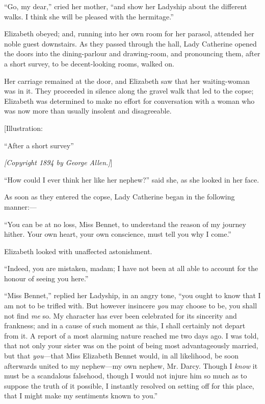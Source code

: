 \documentclass[12pt]{book}
\begin{document}
``Go, my dear,'' cried her mother, ``and show her Ladyship about the different walks. I think she will be pleased with the hermitage.''

Elizabeth obeyed; and, running into her own room for her parasol, attended her noble guest downstairs. As they passed through the hall, Lady Catherine opened the doors into the dining-parlour and drawing-room, and pronouncing them, after a short survey, to be decent-looking rooms, walked on.

Her carriage remained at the door, and Elizabeth saw that her waiting-woman was in it. They proceeded in silence along the gravel walk that led to the copse; Elizabeth was determined to make no effort for conversation with a woman who was now more than usually insolent and disagreeable.

[Illustration:

``After a short survey''

\emph{[\textit{Copyright 1894 by George Allen.}]}]

``How could I ever think her like her nephew?'' said she, as she looked in her face.

As soon as they entered the copse, Lady Catherine began in the following manner:---

``You can be at no loss, Miss Bennet, to understand the reason of my journey hither. Your own heart, your own conscience, must tell you why I come.''

Elizabeth looked with unaffected astonishment.

``Indeed, you are mistaken, madam; I have not been at all able to account for the honour of seeing you here.''

``Miss Bennet,'' replied her Ladyship, in an angry tone, ``you ought to know that I am not to be trifled with. But however insincere \textit{you} may choose to be, you shall not find \textit{me} so. My character has ever been celebrated for its sincerity and frankness; and in a cause of such moment as this, I shall certainly not depart from it. A report of a most alarming nature reached me two days ago. I was told, that not only your sister was on the point of being most advantageously married, but that \textit{you}---that Miss Elizabeth Bennet would, in all likelihood, be soon afterwards united to my nephew---my own nephew, Mr. Darcy. Though I \textit{know} it must be a scandalous falsehood, though I would not injure him so much as to suppose the truth of it possible, I instantly resolved on setting off for this place, that I might make my sentiments known to you.''
\end{document}
